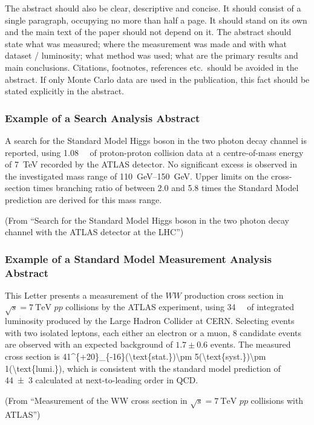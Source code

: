 \documentclass[UKenglish]{latex/atlasdoc}
\begin{document}
The abstract should also be clear, descriptive and concise. 
It should consist of a single paragraph, occupying no more than half a page. 
It should stand on its own and the main text of the paper should not depend on it. 
The abstract should state what was measured; where the measurement was made and with what dataset / luminosity;
what method was used; 
what are the primary results and main conclusions. 
Citations, footnotes, references etc.\ should be avoided in the abstract. 
If only Monte Carlo data are used in the publication, this fact should be stated explicitly in the abstract.  


\subsubsection*{Example of a Search Analysis Abstract}

A search for the Standard Model Higgs boson in the two photon decay channel is reported, 
using \SI{1.08}{\per\fb} of proton-proton collision data at a centre-of-mass energy of \SI{7}{\TeV} recorded by the ATLAS detector.
No significant excess is observed in the investigated mass range of \SIrange{110}{150}{\GeV}. 
Upper limits on the cross-section times branching ratio of between 2.0 and 5.8 times the Standard Model prediction are derived for this mass range.

\noindent(From \enquote{Search for the Standard Model Higgs boson in the two photon decay channel with the ATLAS detector at the LHC})

\subsubsection*{Example of a Standard Model Measurement Analysis Abstract}

This Letter presents a measurement of the $WW$ production cross section in $\sqrt{s} = \SI{7}{\TeV}$ $pp$ collisions by the ATLAS experiment, using \SI{34}{\per\pb} of integrated luminosity produced by the Large Hadron Collider at CERN. Selecting events with two isolated leptons, each either an electron or a muon, 8 candidate events are observed with an expected background of $1.7 \pm 0.6$ events.
The measured cross section is 
\SI[parse-numbers=false]{41^{+20}_{-16}(\text{stat.})\pm 5(\text{syst.})\pm 1(\text{lumi.})}{\pb}, 
which is consistent with the standard model prediction of \SI{44 \pm 3}{\pb} calculated at next-to-leading order in QCD. 

\noindent(From \enquote{Measurement of the WW cross section in $\sqrt{s} = \SI{7}{\TeV}$ $pp$ collisions with ATLAS})
\end{document}
